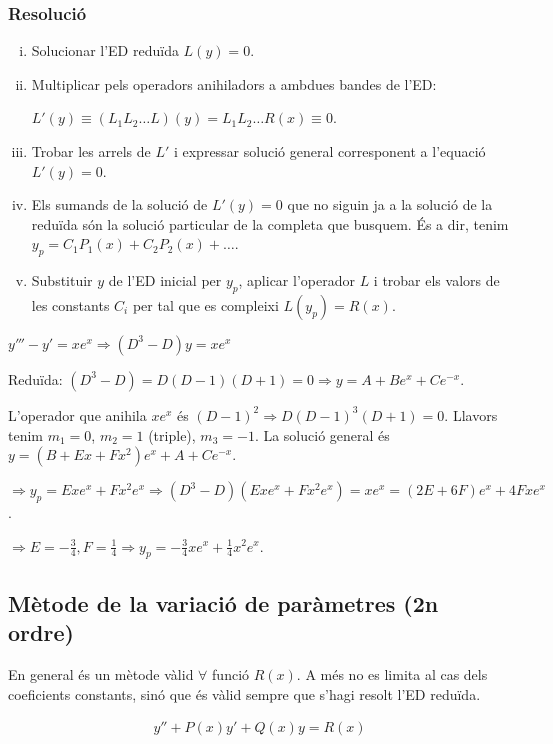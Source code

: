 \subsubsection*{Resolució}
\begin{enumerate}[i)]
    \item Solucionar l'ED reduïda $L(y) = 0$.
    \item Multiplicar pels operadors anihiladors a ambdues bandes de l'ED:

    $L'(y) \equiv (L_{1}L_{2} \dots L)(y) = L_{1}L_{2} \dots R(x) \equiv 0$.
    \item Trobar les arrels de $L'$ i expressar solució general corresponent a l'equació $L'(y) = 0$.
    \item Els sumands de la solució de $L'(y) = 0$ que no siguin ja a la solució de la reduïda són la solució particular de la completa que busquem. És a dir, tenim $y_{p} = C_{1} P_{1}(x) + C_{2} P_{2}(x) + \dots$.
    \item Substituir $y$ de l'ED inicial per $y_{p}$, aplicar l'operador $L$ i trobar els valors de les constants $C_{i}$ per tal que es compleixi $L(y_{p}) = R(x)$.
\end{enumerate}
\begin{example}
    $y''' - y' = x e^{x} \Rightarrow (D^{3} - D) y = xe^{x}$

    Reduïda: $(D^{3} - D) = D (D-1) (D+1) = 0 \Rightarrow \boxed{y = A + Be^{x} + Ce^{-x}}$.

    L'operador que anihila $x e^{x}$ és $(D-1)^{2} \Rightarrow D (D-1)^{3} (D+1) = 0$. Llavors tenim $m_{1} = 0$, $m_{2} = 1$ (triple), $m_{3} = -1$. La solució general és $\boxed{y = (B + Ex + Fx^{2})e^{x} + A + Ce^{-x}}$.

    $\Rightarrow \boxed{y_{p} = Exe^{x} + Fx^{2} e^{x}} \Rightarrow (D^{3}-D) (Exe^{x} + Fx^{2} e^{x}) = xe^{x} = (2E + 6F)e^{x} + 4Fxe^{x}$.

    $\displaystyle \Rightarrow E = -\frac{3}{4}, F = \frac{1}{4} \Rightarrow \boxed{y_{p} = -\frac{3}{4} xe^{x} + \frac{1}{4} x^{2} e^{x}}$.
\end{example}

\subsection{Mètode de la variació de paràmetres (2n ordre)}
En general és un mètode vàlid $\forall$ funció $R(x)$. A més no es limita al cas dels coeficients constants, sinó que és vàlid sempre que s'hagi resolt l'ED reduïda.
\begin{defi}
	\begin{align}\label{ed-var-par-2}
		y'' + P(x) y' + Q(x) y = R(x)
	\end{align}
\end{defi}

